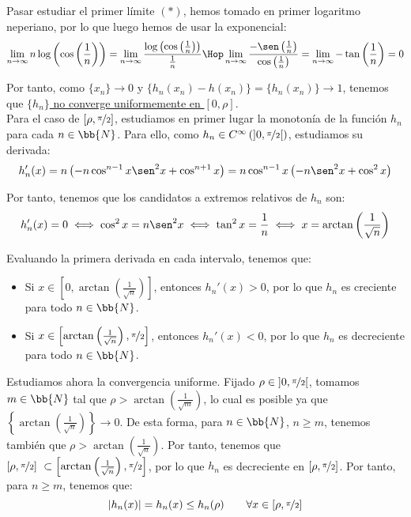 \begin{ejercicio}
    Pasar estudiar el primer límite $(\ast)$, hemos tomado en primer logaritmo neperiano, por lo que luego hemos de usar la exponencial:
    \begin{equation*}
        \lim_{n\to \infty} n \log\left(\cos\left(\frac{1}{n}\right)\right) = \lim_{n\to \infty} \frac{\log\left(\cos\left(\frac{1}{n}\right)\right)}{\frac{1}{n}} \Hop
        \lim_{n\to \infty} \frac{-\sen\left(\frac{1}{n}\right)}{\cos\left(\frac{1}{n}\right)}
        = \lim_{n\to \infty} -\tan \left(\frac{1}{n}\right) = 0
    \end{equation*}

    Por tanto, como $\{x_n\}\to 0$ y $\{h_n(x_n)-h(x_n)\}=\{h_n(x_n)\}\to 1$, tenemos que \ul{$\{h_n\}$ no converge uniformemente en $[0,\rho]$}.\\

    Para el caso de $[\rho,\nicefrac{\pi}{2}]$, estudiamos en primer lugar la monotonía de la función $h_n$ para cada $n\in \bb{N}$. Para ello, como $h_n\in C^\infty\left(\left]0,\nicefrac{\pi}{2}\right[\right)$, estudiamos
    su derivada:
    \begin{equation*}
        h_n'(x) = n\left(-n\cos^{n-1}x\sen^2 x + \cos^{n+1} x\right) = n\cos^{n-1}x\left(-n\sen^2 x + \cos^2 x\right)
    \end{equation*}

    Por tanto, tenemos que los candidatos a extremos relativos de $h_n$ son:
    \begin{equation*}
        h_n'(x) = 0 \iff \cos^2 x = n\sen^2 x \iff \tan^2 x = \frac{1}{n}
        \iff x = \arctan\left(\frac{1}{\sqrt{n}}\right)
    \end{equation*}

    Evaluando la primera derivada en cada intervalo, tenemos que:
    \begin{itemize}
        \item Si $x\in \left[0,\arctan\left(\frac{1}{\sqrt{n}}\right)\right]$, entonces $h_n'(x) > 0$, por lo que $h_n$ es creciente para todo $n\in \bb{N}$.
        \item Si $x\in \left[\arctan\left(\frac{1}{\sqrt{n}}\right),\nicefrac{\pi}{2}\right]$, entonces $h_n'(x) < 0$, por lo que $h_n$ es decreciente para todo $n\in \bb{N}$.
    \end{itemize}

    Estudiamos ahora la convergencia uniforme. Fijado $\rho \in \left]0,\nicefrac{\pi}{2}\right[$,
    tomamos $m\in \bb{N}$ tal que $\rho > \arctan\left(\frac{1}{\sqrt{m}}\right)$, lo cual es posible ya que
    $\left\{\arctan\left(\frac{1}{\sqrt{n}}\right)\right\}\to 0$. De esta forma,
    para $n\in \bb{N}$, $n\geq m$, tenemos también que $\rho > \arctan\left(\frac{1}{\sqrt{n}}\right)$. Por tanto,
    tenemos que $[\rho ,\nicefrac{\pi}{2}]~\subset \left[\arctan\left(\frac{1}{\sqrt{n}}\right),\nicefrac{\pi}{2}\right]$,
    por lo que $h_n$ es decreciente en $[\rho,\nicefrac{\pi}{2}]$. Por tanto, para $n\geq m$, tenemos que:
    \begin{equation*}
        |h_n(x)| = h_n(x) \leq h_n(\rho) \qquad \forall x\in [\rho,\nicefrac{\pi}{2}]
    \end{equation*}


\end{ejercicio}
